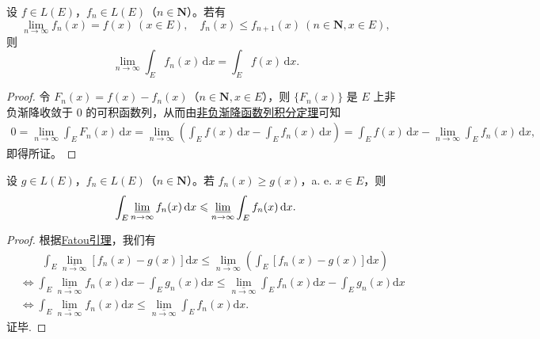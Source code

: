 \documentclass[../../main.tex]{subfiles}
\begin{document}
\begin{theorem}\label{theorem:递增可测函数列的积分和极限可交换}
设 $f \in L(E)$，$f_n \in L(E)$（$n \in \mathbf{N}$）。若有
\[
\lim_{n \to \infty} f_n(x) = f(x) \ (x \in E), \quad f_n(x) \leqslant f_{n + 1}(x) \ (n \in \mathbf{N}, x \in E),
\]
则
\[
\lim_{n \to \infty} \int_E f_n(x) \, \mathrm{d}x = \int_E f(x) \, \mathrm{d}x.
\]
\end{theorem}
\begin{proof} 
令 $F_n(x) = f(x) - f_n(x)$（$n \in \mathbf{N}, x \in E$），则 $\{ F_n(x) \}$ 是 $E$ 上非负渐降收敛于 $0$ 的可积函数列，从而由\hyperref[corollary:非负渐降函数列积分定理]{非负渐降函数列积分定理}可知
\begin{align*}
0 = \lim_{n \to \infty} \int_E F_n(x) \, \mathrm{d}x 
= \lim_{n \to \infty} \left( \int_E f(x) \, \mathrm{d}x - \int_E f_n(x) \, \mathrm{d}x \right) 
= \int_E f(x) \, \mathrm{d}x - \lim_{n \to \infty} \int_E f_n(x) \, \mathrm{d}x,
\end{align*}
即得所证。

\end{proof}

\begin{proposition}
设 $g \in L(E)$，$f_n \in L(E)$（$n \in \mathbf{N}$）。若 $f_n(x) \geqslant g(x)$，a. e. $x \in E$，则
\[
\int_E \varliminf_{n \to \infty} f_n(x) \, \mathrm{d}x \leqslant \varliminf_{n \to \infty} \int_E f_n(x) \, \mathrm{d}x.
\]
\end{proposition}
\begin{proof}
根据\hyperref[lemma:Fatou引理]{Fatou引理}，我们有
\begin{align*}
&\quad \quad \int_E{\underset{n\rightarrow \infty}{\underline{\lim }}\left[ f_n\left( x \right) -g\left( x \right) \right] \mathrm{d}x}\leqslant \underset{n\rightarrow \infty}{\underline{\lim }}\left( \int_E{\left[ f_n\left( x \right) -g\left( x \right) \right] \mathrm{d}x} \right) 
\\
&\Longleftrightarrow \int_E{\underset{n\rightarrow \infty}{\underline{\lim }}f_n\left( x \right) \mathrm{d}x}-\int_E{g_n\left( x \right) \mathrm{d}x}\leqslant \underset{n\rightarrow \infty}{\underline{\lim }}\int_E{f_n\left( x \right) \mathrm{d}x}-\int_E{g_n\left( x \right) \mathrm{d}x}
\\
&\Longleftrightarrow \int_E{\underset{n\rightarrow \infty}{\underline{\lim }}f_n\left( x \right) \mathrm{d}x}\leqslant \underset{n\rightarrow \infty}{\underline{\lim }}\int_E{f_n\left( x \right) \mathrm{d}x}.
\end{align*}
证毕.

\end{proof}
\end{document}
